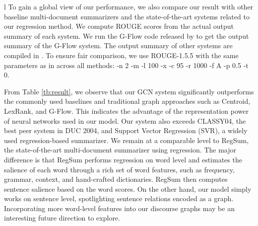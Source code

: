 \documentclass[11pt,a4paper]{article}
\begin{document}
\begin{table}[]
\begin{tabular}{l}
To gain a global view of our performance, we also compare our result with other baseline multi-document summarizers and the state-of-the-art systems related to our regression method.
We compute ROUGE scores from the actual output summary of each system.
We run the G-Flow code released by  to get the output summary of the G-Flow system. The output summary of other systems are compiled in .
To ensure fair comparison, we use ROUGE-1.5.5 with the same parameters as in  across all methods: -n 2 -m -l 100 -x -c 95 -r 1000 -f A -p 0.5 -t 0.

From Table \ref{tb:result}, we observe that our GCN system significantly outperforms the commonly used baselines and  traditional
graph approaches such as Centroid, LexRank, and G-Flow.
This indicates the advantage of the representation power of neural networks used in our model.
Our system also exceeds CLASSY04, the best peer system in DUC 2004, and Support Vector Regression (SVR), a widely used regression-based summarizer.
We remain at a comparable level to RegSum, the state-of-the-art multi-document summarizer using regression. 
The major difference is that RegSum performs regression on word level and estimates the salience of each word through a rich set of word features, such as frequency, grammar, context, and hand-crafted dictionaries. 
RegSum then computes sentence salience based on the word scores.
On the other hand, our model simply works on sentence level, spotlighting sentence relations encoded as a graph.
Incorporating more word-level features into our discourse graphs may be an interesting future direction to explore. 


\begin{table}[t]
\centering
\hspace{-1mm}
\caption{Training statistics for the four experiments.
The first row shows the number of iterations the model took to reach the best validation result before an early stop.
The train cost and validation cost at that time step are shown in the second row and third row, respectively.
All the values are the average over 10 repeated trials.}
\label{tb:iter_and_cost}
\vspace{-5mm}
\end{table}


\end{tabular}
\end{table}
\end{document}
